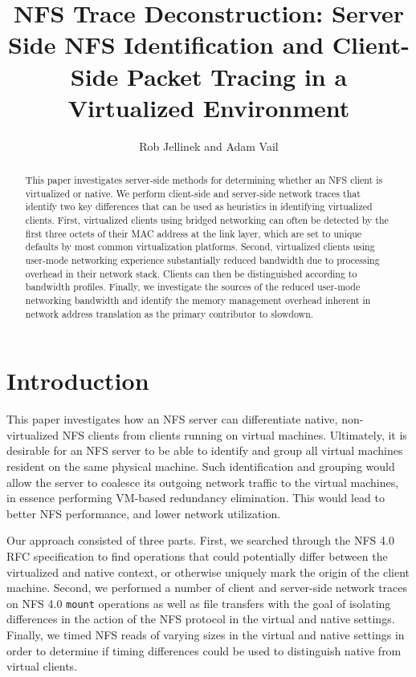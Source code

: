 \documentclass[11pt,pdftex,twocolumn]{article}
\title{NFS Trace Deconstruction: 
Server Side NFS Identification and Client-Side Packet Tracing in a Virtualized Environment}
\author{Rob Jellinek and Adam Vail}
\begin{document}
\maketitle

\begin{abstract}
This paper investigates server-side methods for determining whether an NFS client is virtualized or native. We perform client-side and server-side network traces that identify two key differences that can be used as heuristics in identifying virtualized clients. First, virtualized clients using bridged networking can often be detected by the first three octets of their MAC address at the link layer, which are set to unique defaults by most common virtualization platforms. Second, virtualized clients using user-mode networking experience substantially reduced bandwidth due to processing overhead in their network stack. Clients can then be distinguished according to bandwidth profiles. Finally, we investigate the sources of the reduced user-mode networking bandwidth and identify the memory management overhead inherent in network address translation as the primary contributor to slowdown.
\end{abstract}

\section{Introduction}
This paper investigates how an NFS server can differentiate native, non-virtualized NFS clients from clients running on virtual machines. 
Ultimately, it is desirable for an NFS server to be able to identify and group all virtual machines resident on the same physical machine. Such identification and grouping would allow the server to coalesce its outgoing network traffic to the virtual machines, in essence performing VM-based redundancy elimination. This would lead to better NFS performance, and lower network utilization.

Our approach consisted of three parts. First, we searched through the NFS 4.0 RFC specification \cite{shepler2003network} to find operations that could potentially differ between the virtualized and native context, or otherwise uniquely mark the origin of the client machine. Second, we performed a number of client and server-side network traces on NFS 4.0 \texttt{mount} operations as well as file transfers with the goal of isolating differences in the action of the NFS protocol in the virtual and native settings. Finally, we timed NFS reads of varying sizes in the virtual and native settings in order to determine if timing differences could be used to distinguish native from virtual clients. 
\end{document}
